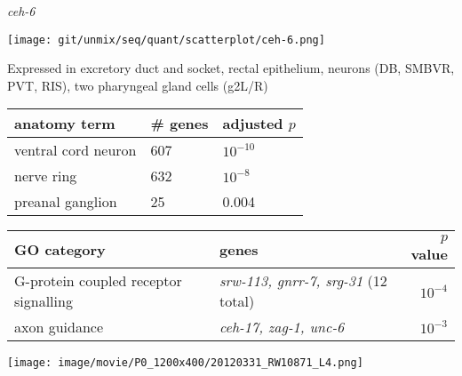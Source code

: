 \documentclass[serif,9pt]{beamer}
\begin{document}
\begin{frame}{{\em ceh-6}}

\begin{minipage}{0.4\textwidth}
\texttt{[image: git/unmix/seq/quant/scatterplot/ceh-6.png]}
\end{minipage}
\begin{minipage}{0.58\textwidth}

{\small Expressed in excretory duct and socket, rectal epithelium,
neurons (DB, SMBVR, PVT, RIS),
two pharyngeal gland cells (g2L/R) }

\begin{table}[!tbp]\scriptsize
\begin{tabular}{lll}
anatomy term & \# genes & adjusted $p$ \\
\hline
ventral cord neuron & 607 & $10^{-10}$ \\
nerve ring & 632 & $10^{-8}$ \\
preanal ganglion & 25 & 0.004 \\
\end{tabular}
\end{table}
\end{minipage}

\begin{table}\footnotesize
\begin{tabular}{llr}
GO category & genes & $p$ value \\
\hline
G-protein coupled receptor signalling & {\em srw-113, gnrr-7, srg-31} (12 total) & $10^{-4}$ \\
axon guidance & {\em ceh-17, zag-1, unc-6} & $10^{-3}$ \\
\end{tabular}
\end{table}

\texttt{[image: image/movie/P0\_1200x400/20120331\_RW10871\_L4.png]}

\end{frame}
\end{document}

